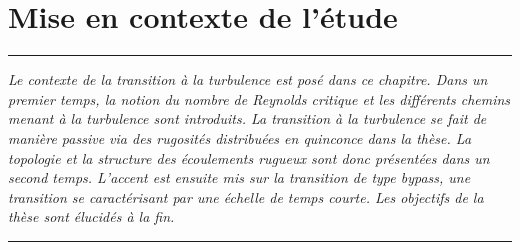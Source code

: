 
\lhead[\fancyplain{}{\leftmark}]%
      {\fancyplain{}{}} %
\chead[\fancyplain{}{}]%
      {\fancyplain{}{}}
\rhead[\fancyplain{}{}]%
      {\fancyplain{}{\rightmark}}%
\lfoot[\fancyplain{}{}]%
      {\fancyplain{}{}}
\cfoot[\fancyplain{}{\thepage}]%
      {\fancyplain{}{\thepage}} %
\rfoot[\fancyplain{}{}]%
     {\fancyplain{}{\scriptsize}}


\renewcommand\chapterheadstartvskip{\vspace*{-2\baselineskip}}
\chapter{Mise en contexte de l'étude}
\label{ch/biblio}


\begin{center}
\rule{0.8\linewidth}{.5pt}
\begin{minipage}{0.8\linewidth}
\smallskip

\textit{Le contexte de la transition à la turbulence est posé dans ce chapitre. Dans un premier temps, la notion du nombre de Reynolds critique et les différents chemins menant à la turbulence sont introduits. La transition à la turbulence se fait de manière passive via des rugosités distribuées en quinconce dans la thèse. La topologie et la structure des écoulements rugueux sont donc présentées dans un second temps. L'accent est ensuite mis sur la transition de type bypass, une transition se caractérisant par une échelle de temps courte. Les objectifs de la thèse sont élucidés à la fin.}

\end{minipage}
\smallskip
\rule{0.8\linewidth}{.5pt}
\end{center}

\clearpage
\setbeforeminitoc
$~$
\vfill
\minitoc
\vfill
\newpage
\resetafterminitoc

